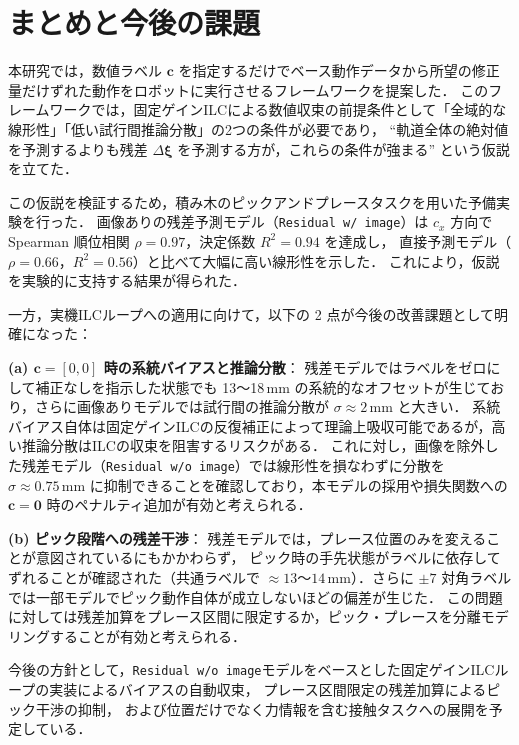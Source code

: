 \section{まとめと今後の課題}
\label{sec:conclusion}

本研究では，数値ラベル $\bm{c}$ を指定するだけでベース動作データから所望の修正量だけずれた動作をロボットに実行させるフレームワークを提案した．
このフレームワークでは，固定ゲインILCによる数値収束の前提条件として「全域的な線形性」「低い試行間推論分散」の2つの条件が必要であり，
``軌道全体の絶対値を予測するよりも残差 $\Delta\bm{\xi}$ を予測する方が，これらの条件が強まる'' という仮説を立てた．

この仮説を検証するため，積み木のピックアンドプレースタスクを用いた予備実験を行った．
画像ありの残差予測モデル（\texttt{Residual w/ image}）は $c_x$ 方向で Spearman 順位相関 $\rho = 0.97$，決定係数 $R^2 = 0.94$ を達成し，
直接予測モデル（$\rho = 0.66$，$R^2 = 0.56$）と比べて大幅に高い線形性を示した．
これにより，仮説を実験的に支持する結果が得られた．

一方，実機ILCループへの適用に向けて，以下の 2 点が今後の改善課題として明確になった：

\noindent\textbf{(a) $\bm{c} = [0,0]$ 時の系統バイアスと推論分散}：
残差モデルではラベルをゼロにして補正なしを指示した状態でも 13〜18\,mm の系統的なオフセットが生じており，さらに画像ありモデルでは試行間の推論分散が $\sigma \approx 2\,\text{mm}$ と大きい．
系統バイアス自体は固定ゲインILCの反復補正によって理論上吸収可能であるが，高い推論分散はILCの収束を阻害するリスクがある．
これに対し，画像を除外した残差モデル（\texttt{Residual w/o image}）では線形性を損なわずに分散を $\sigma \approx 0.75\,\text{mm}$ に抑制できることを確認しており，本モデルの採用や損失関数への $\bm{c} = \bm{0}$ 時のペナルティ追加が有効と考えられる．

\noindent\textbf{(b) ピック段階への残差干渉}：
残差モデルでは，プレース位置のみを変えることが意図されているにもかかわらず，
ピック時の手先状態がラベルに依存してずれることが確認された（共通ラベルで $\approx 13$～$14$\,mm）．さらに $\pm 7$ 対角ラベルでは一部モデルでピック動作自体が成立しないほどの偏差が生じた．
この問題に対しては残差加算をプレース区間に限定するか，ピック・プレースを分離モデリングすることが有効と考えられる．

今後の方針として，\texttt{Residual w/o image}モデルをベースとした固定ゲインILCループの実装によるバイアスの自動収束，
プレース区間限定の残差加算によるピック干渉の抑制，
および位置だけでなく力情報を含む接触タスクへの展開を予定している．